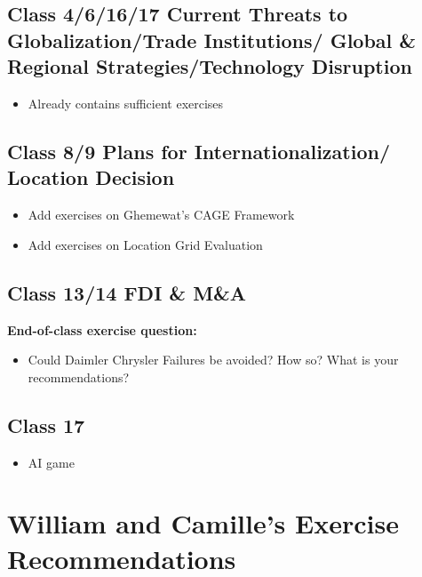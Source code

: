 \documentclass[
  11pt,
]{article}
\providecommand{\tightlist}{%
  \setlength{\itemsep}{0pt}\setlength{\parskip}{0pt}}
\begin{document}
\subsection{Class 4/6/16/17 Current Threats to Globalization/Trade
Institutions/ Global \& Regional Strategies/Technology
Disruption}\label{class-461617-current-threats-to-globalizationtrade-institutions-global-regional-strategiestechnology-disruption}

\begin{itemize}
\tightlist
\item
  Already contains sufficient exercises
\end{itemize}

\subsection{Class 8/9 Plans for Internationalization/ Location
Decision}\label{class-89-plans-for-internationalization-location-decision}

\begin{itemize}
\tightlist
\item
  Add exercises on Ghemewat's CAGE Framework
\item
  Add exercises on Location Grid Evaluation
\end{itemize}

\subsection{Class 13/14 FDI \& M\&A}\label{class-1314-fdi-ma}

\textbf{End-of-class exercise question:}

\begin{itemize}
\tightlist
\item
  Could Daimler Chrysler Failures be avoided? How so? What is your
  recommendations?
\end{itemize}

\subsection{Class 17}\label{class-17}

\begin{itemize}
\tightlist
\item
  AI game
\end{itemize}

\section{William and Camille's Exercise
Recommendations}\label{william-and-camilles-exercise-recommendations}
\end{document}
